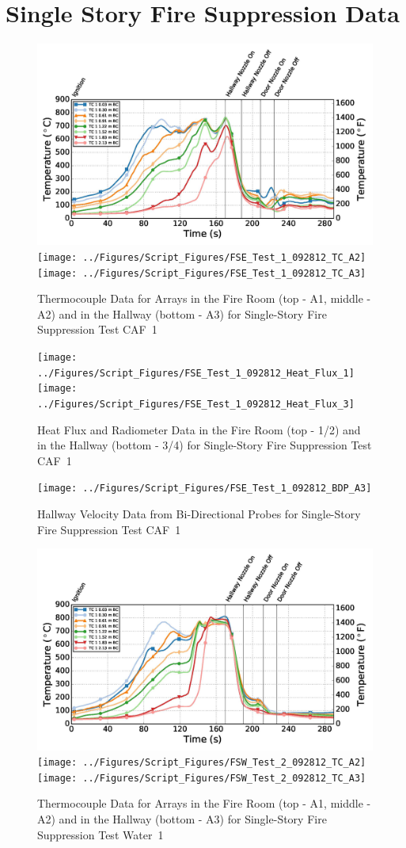 \documentclass[12pt,oneside]{book}
\begin{document}
\chapter{Single Story Fire Suppression Data}
\label{app:fire_suppression}
\newpage

\begin{figure}[ht]
\includegraphics[width=.725\columnwidth]{../Figures/Script_Figures/FSE_Test_1_092812_TC_A1}
\texttt{[image: ../Figures/Script\_Figures/FSE\_Test\_1\_092812\_TC\_A2]}
\texttt{[image: ../Figures/Script\_Figures/FSE\_Test\_1\_092812\_TC\_A3]}
\caption{Thermocouple Data for Arrays in the Fire Room (top - A1, middle - A2) and in the Hallway (bottom - A3) for Single-Story Fire Suppression Test CAF~1}
\end{figure}

\begin{figure}[ht]
\texttt{[image: ../Figures/Script\_Figures/FSE\_Test\_1\_092812\_Heat\_Flux\_1]}
\texttt{[image: ../Figures/Script\_Figures/FSE\_Test\_1\_092812\_Heat\_Flux\_3]}
\caption{Heat Flux and Radiometer Data in the Fire Room (top - 1/2) and in the Hallway (bottom - 3/4) for Single-Story Fire Suppression Test CAF~1}
\end{figure}

\begin{figure}[ht]
\texttt{[image: ../Figures/Script\_Figures/FSE\_Test\_1\_092812\_BDP\_A3]}
\caption{Hallway Velocity Data from Bi-Directional Probes for Single-Story Fire Suppression Test CAF~1}
\end{figure}

\begin{figure}[ht]
\includegraphics[width=.725\columnwidth]{../Figures/Script_Figures/FSW_Test_2_092812_TC_A1}
\texttt{[image: ../Figures/Script\_Figures/FSW\_Test\_2\_092812\_TC\_A2]}
\texttt{[image: ../Figures/Script\_Figures/FSW\_Test\_2\_092812\_TC\_A3]}
\caption{Thermocouple Data for Arrays in the Fire Room (top - A1, middle - A2) and in the Hallway (bottom - A3) for Single-Story Fire Suppression Test Water~1}
\end{figure}
\end{document}
